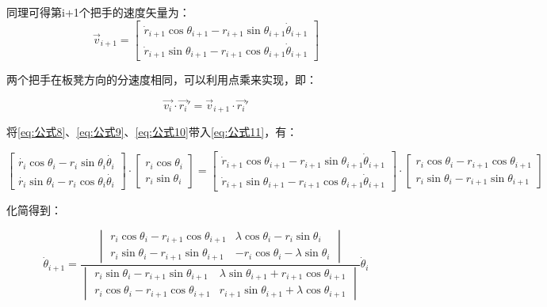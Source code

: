 \documentclass[withoutpreface,bwprint]{cumcmthesis}
\begin{document}
同理可得第i+1个把手的速度矢量为：
\begin{equation}
\label{eq:公式11}
\overrightarrow{v }_{i+1} =\begin{bmatrix}\dot{r}_{i+1}\cos \theta _{i+1} -r_{i +1}\sin \theta _{i+1}\dot{\theta  }_{i+1}  \\ \dot{r}_{i+1}\sin \theta _{i+1} -r_{i+1 }\cos\theta _{i+1}\dot{\theta  }_{i+1}\end{bmatrix} 
\end{equation}

两个把手在板凳方向的分速度相同，可以利用点乘来实现，即：

\begin{equation}
\label{eq:公式12}
\overrightarrow{v_{i} }\cdot \overrightarrow{r_{i} }'=\overrightarrow{v }_{i+1}\cdot \overrightarrow{r_{i} }'
\end{equation}

将\cref{eq:公式8}、\cref{eq:公式9}、\cref{eq:公式10}带入\cref{eq:公式11}，有：

$$
\begin{bmatrix}\dot{r_{i }}\cos \theta _{i} -r_{i }\sin \theta _{i}\dot{\theta _{i} }  \\ \dot{r_{i }}\sin \theta _{i} -r_{i }\cos\theta _{i}\dot{\theta _{i} }\end{bmatrix}\cdot \begin{bmatrix}r_{i} \cos \theta _{i} \\ r_{i} \sin \theta _{i}\end{bmatrix} =\begin{bmatrix}\dot{r}_{i +1}\cos \theta _{i+1} -r_{i +1}\sin \theta _{i+1}\dot{\theta  }_{i+1}  \\ \dot{r}_{i+1 }\sin \theta _{i+1} -r_{i+1 }\cos\theta _{i+1}\dot{\theta  }_{i+1}\end{bmatrix}\cdot \begin{bmatrix}r_{i} \cos \theta _{i}-r_{i+1} \cos \theta _{i+1} \\r_{i} \sin \theta _{i}-r_{i+1} \sin \theta _{i+1}\end{bmatrix}
$$

化简得到：

\begin{equation}
\label{eq:公式13}
\dot{\theta } _{i+1} =      \frac{\begin{vmatrix}  r_{i} \cos \theta _{i}-r_{i+1} \cos \theta _{i+1}   & \lambda \cos \theta _{i} - r_{i}\sin\theta _{i} \\r_{i} \sin \theta _{i}-r_{i+1} \sin \theta _{i+1}  &-r_{i} \cos \theta _{i}-\lambda \sin \theta _{i}\end{vmatrix}  }{\begin{vmatrix}r_{i} \sin \theta _{i}-r_{i+1} \sin \theta _{i+1}  &\lambda  \sin \theta _{i+1}+r _{i+1} \cos \theta _{i+1} \\r_{i} \cos \theta _{i}-r_{i+1} \cos \theta _{i+1}  &r _{i+1} \sin \theta _{i+1}+ \lambda \cos \theta _{i+1}\end{vmatrix}}      \dot{\theta }_{i}
\end{equation}
\end{document}
